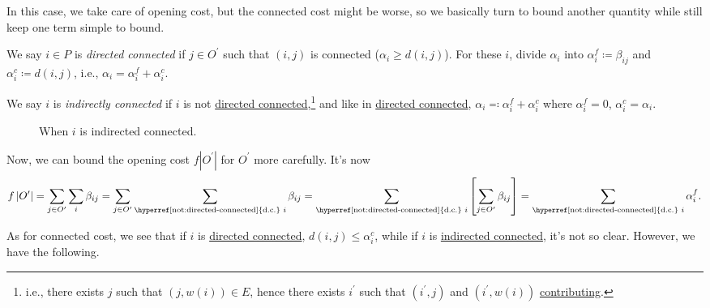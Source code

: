 \begin{note}
	In this case, we take care of opening cost, but the connected cost might be worse, so we basically turn to bound another quantity while still keep one term simple to bound.
\end{note}

\begin{notation}\label{not:directed-connected}
	We say \(i\in P\) is \emph{directed connected} if \(j\in O^\prime \) such that \((i, j)\) is connected (\(\alpha _{i} \geq d(i, j)\)). For these \(i\), divide \(\alpha _i\) into \(\alpha _i^f \coloneqq \beta _{ij}\) and \(\alpha _i^c\coloneqq d(i, j)\), i.e., \(\alpha _i = \alpha _i^f + \alpha _i^c\).
\end{notation}

\begin{notation}\label{not:indirected-connected}
	We say \(i\) is \emph{indirectly connected} if \(i\) is not \hyperref[not:directed-connected]{directed connected},\footnote{i.e.,  there exists \(j\) such that \((j, w(i))\in E\), hence there exists \(i^\prime\) such that \((i^\prime , j)\) and \((i^\prime , w(i))\) \hyperref[not:contributing]{contributing}.} and like in \hyperref[not:directed-connected]{directed connected}, \(\alpha_i \eqqcolon \alpha _i^f + \alpha _i^c\) where \(\alpha _i^f = 0\), \(\alpha _i^c = \alpha _i\).
	\begin{figure}[H]
		\centering
		\caption{When \(i\) is indirected connected.}
		\label{fig:indirected-connected}
	\end{figure}
\end{notation}

Now, we can bound the opening cost \(f\left\vert O^\prime \right\vert\) for \(O^\prime \) more carefully. It's now
\[
	f \left\vert O^\prime  \right\vert
	= \sum_{j\in O^\prime } \sum_{i} \beta _{ij} = \sum_{j\in O^\prime } \sum_{\text{\hyperref[not:directed-connected]{d.c.} }i} \beta _{ij}
	= \sum_{\text{\hyperref[not:directed-connected]{d.c.} }i} \left[ \sum_{j\in O^\prime} \beta _{ij} \right]
	= \sum_{\text{\hyperref[not:directed-connected]{d.c.} }i} \alpha _i^f.
\]

As for connected cost, we see that if \(i\) is \hyperref[not:directed-connected]{directed connected}, \(d(i, j) \leq \alpha _i^c\), while if \(i\) is \hyperref[not:indirected-connected]{indirected connected}, it's not so clear. However, we have the following.

